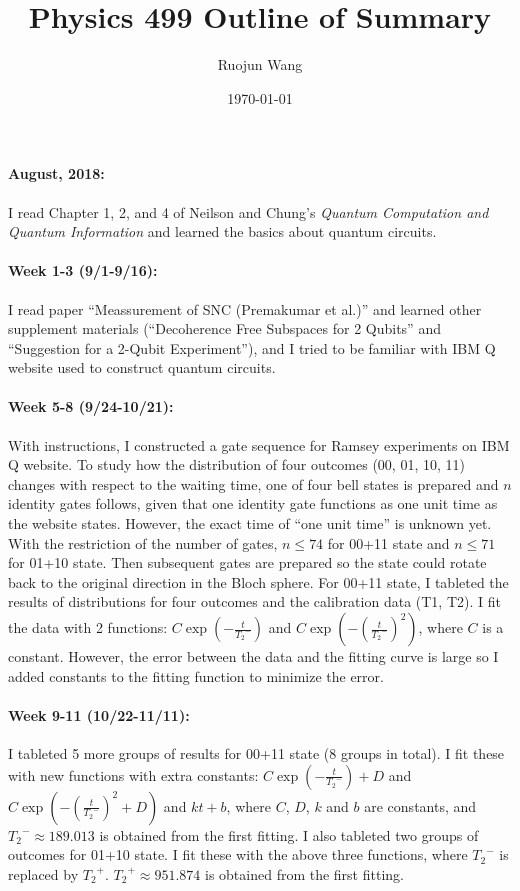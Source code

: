 \documentclass[letterpaper]{article}
\title{	
	\normalfont \normalsize 
	\huge Physics 499 Outline of Summary\\ %
}
\author{Ruojun Wang} %
\date{\normalsize\today} %
\numberwithin{equation}{section} %
\numberwithin{figure}{section} %
\numberwithin{table}{section} %
\begin{document}
\maketitle %

\paragraph{August, 2018:}
I read Chapter 1, 2, and 4 of Neilson and Chung's \textit{Quantum Computation and Quantum Information} and learned the basics about quantum circuits. 

\paragraph{Week 1-3 (9/1-9/16):}
I read paper \enquote{Meassurement of SNC (Premakumar et al.)} and learned other supplement materials (\enquote{Decoherence Free Subspaces for 2 Qubits} and \enquote{Suggestion for a 2-Qubit Experiment}), and I tried to be familiar with IBM Q website used to construct quantum circuits. 

\paragraph{Week 5-8 (9/24-10/21):}
With instructions, I constructed a gate sequence for Ramsey experiments on IBM Q website. To study how the distribution of four outcomes (00, 01, 10, 11) changes with respect to the waiting time, one of four bell states is prepared and $n$ identity gates follows, given that one identity gate functions as one unit time as the website states. However, the exact time of \enquote{one unit time} is unknown yet. With the restriction of the number of gates, $n\leq74$ for 00+11 state and $n\leq71$ for 01+10 state. Then subsequent gates are prepared so the state could rotate back to the original direction in the Bloch sphere. For 00+11 state, I tableted the results of distributions for four outcomes and the calibration data (T1, T2). I fit the data with 2 functions: $C \exp(- \frac{t}{{T_2}^-})$ and $C \exp(- (\frac{t}{{T_2}^-})^2)$, where $C$ is a constant. However, the error between the data and the fitting curve is large so I added constants to the fitting function to minimize the error. 

\paragraph{Week 9-11 (10/22-11/11):}
I tableted 5 more groups of results for 00+11 state (8 groups in total). I fit these with new functions with extra constants: $C \exp(- \frac{t}{{T_2}^-})+D$ and $C \exp(- (\frac{t}{{T_2}^-})^2+D)$ and $k t + b$, where $C$, $D$, $k$ and $b$ are constants, and ${T_2}^- \approx 189.013$ is obtained from the first fitting. I also tableted two groups of outcomes for 01+10 state. I fit these with the above three functions, where ${T_2}^-$ is replaced by ${T_2}^+$. ${T_2}^+ \approx 951.874$ is obtained from the first fitting.
\end{document}
